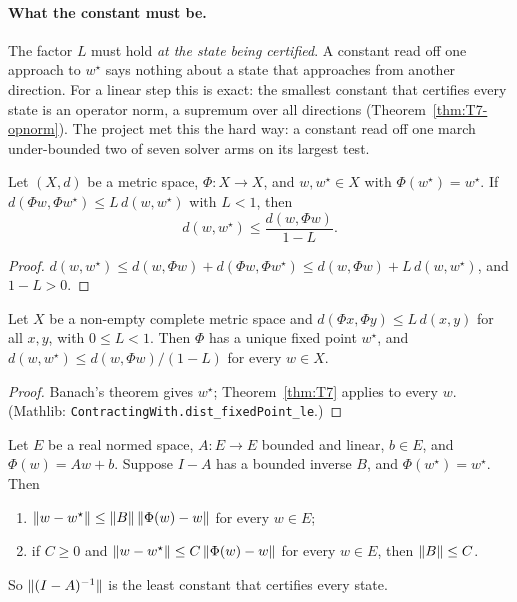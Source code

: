 \paragraph{What the constant must be.}
The factor $L$ must hold \emph{at the state being certified}.  A constant read
off one approach to $w^\star$ says nothing about a state that approaches from
another direction.  For a linear step this is exact: the smallest constant that
certifies every state is an operator norm, a supremum over all directions
(Theorem~\ref{thm:T7-opnorm}).  The project met this the hard way: a constant
read off one march under-bounded two of seven solver arms on its largest test.

\begin{theorem}\label{thm:T7}
  \leanok
  Let $(X,d)$ be a metric space, $\Phi:X\to X$, and $w,w^\star\in X$ with
  $\Phi(w^\star)=w^\star$.  If $d(\Phi w,\Phi w^\star)\le L\,d(w,w^\star)$ with
  $L<1$, then
  \[
    d(w,w^\star)\le\frac{d(w,\Phi w)}{1-L}.
  \]
\end{theorem}

\begin{proof}
  \leanok
  $d(w,w^\star)\le d(w,\Phi w)+d(\Phi w,\Phi w^\star)\le d(w,\Phi w)+L\,d(w,w^\star)$,
  and $1-L>0$.
\end{proof}

\begin{corollary}\label{cor:T7-banach}
  \leanok
  Let $X$ be a non-empty complete metric space and
  $d(\Phi x,\Phi y)\le L\,d(x,y)$ for all $x,y$, with $0\le L<1$.  Then $\Phi$
  has a unique fixed point $w^\star$, and
  $d(w,w^\star)\le d(w,\Phi w)/(1-L)$ for every $w\in X$.
\end{corollary}

\begin{proof}
  \leanok
  Banach's theorem gives $w^\star$; Theorem~\ref{thm:T7} applies to every $w$.
  (Mathlib: \texttt{ContractingWith.dist\_fixedPoint\_le}.)
\end{proof}

\begin{theorem}\label{thm:T7-opnorm}
  \leanok
  Let $E$ be a real normed space, $A:E\to E$ bounded and linear, $b\in E$, and
  $\Phi(w)=Aw+b$.  Suppose $I-A$ has a bounded inverse $B$, and
  $\Phi(w^\star)=w^\star$.  Then
  \begin{enumerate}
    \item $\lVert w-w^\star\rVert\le\lVert B\rVert\,\lVert \Phi(w)-w\rVert$ for every $w\in E$;
    \item if $C\ge0$ and $\lVert w-w^\star\rVert\le C\,\lVert \Phi(w)-w\rVert$ for every
      $w\in E$, then $\lVert B\rVert\le C$.
  \end{enumerate}
  So $\lVert (I-A)^{-1}\rVert$ is the least constant that certifies every state.
\end{theorem}

